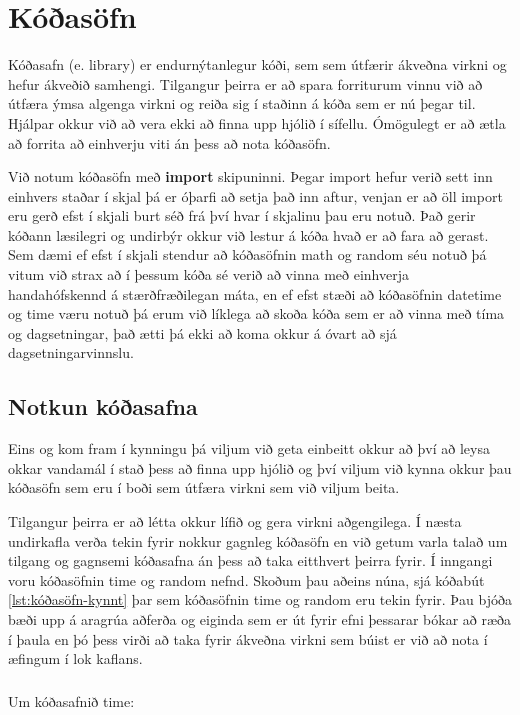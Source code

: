 
\chapter{Kóðasöfn}\label{k:import}
Kóðasafn (e. library) er endurnýtanlegur kóði, sem sem útfærir ákveðna virkni og hefur ákveðið samhengi.
Tilgangur þeirra er að spara forriturum vinnu við að útfæra ýmsa algenga virkni og reiða sig í staðinn á kóða sem er nú þegar til.
Hjálpar okkur við að vera ekki að finna upp hjólið í sífellu.
Ómögulegt er að ætla að forrita að einhverju viti án þess að nota kóðasöfn.

Við notum kóðasöfn með \textbf{import} skipuninni. 
Þegar import hefur verið sett inn einhvers staðar í skjal þá er óþarfi að setja það inn aftur, venjan er að öll import eru gerð efst í skjali burt séð frá því hvar í skjalinu þau eru notuð.
Það gerir kóðann læsilegri og undirbýr okkur við lestur á kóða hvað er að fara að gerast.
Sem dæmi ef efst í skjali stendur að kóðasöfnin math og random séu notuð þá vitum við strax að í þessum kóða sé verið að vinna með einhverja handahófskennd á stærðfræðilegan máta, en ef efst stæði að kóðasöfnin datetime og time væru notuð þá erum við líklega að skoða kóða sem er að vinna með tíma og dagsetningar, það ætti þá ekki að koma okkur á óvart að sjá dagsetningarvinnslu.

\section{Notkun kóðasafna}\label{uk:kóðasöfn-kynnt}
Eins og kom fram í kynningu þá viljum við geta einbeitt okkur að því að leysa okkar vandamál í stað þess að finna upp hjólið og því viljum við kynna okkur þau kóðasöfn sem eru í boði sem útfæra virkni sem við viljum beita.

Tilgangur þeirra er að létta okkur lífið og gera virkni aðgengilega.
Í næsta undirkafla verða tekin fyrir nokkur gagnleg kóðasöfn en við getum varla talað um tilgang og gagnsemi kóðasafna án þess að taka eitthvert þeirra fyrir.
Í inngangi voru kóðasöfnin time og random nefnd.
Skoðum þau aðeins núna, sjá kóðabút \ref{lst:kóðasöfn-kynnt} þar sem kóðasöfnin time og random eru tekin fyrir.
Þau bjóða bæði upp á aragrúa aðferða og eiginda sem er út fyrir efni þessarar bókar að ræða í þaula en þó þess virði að taka fyrir ákveðna virkni sem búist er við að nota í æfingum í lok kaflans.
\paragraph{}
Um kóðasafnið time:

